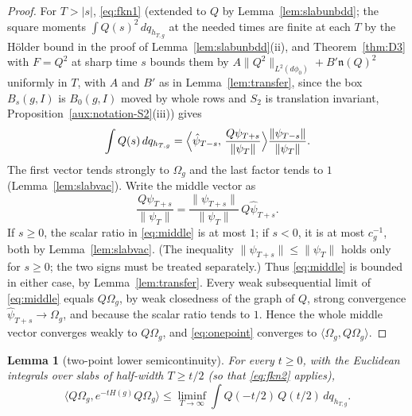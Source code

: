 \documentclass[11pt,a4paper]{article}
\theoremstyle{plain}
\newtheorem{lemma}[theorem]{Lemma}
\theoremstyle{definition}
\theoremstyle{plain}
\theoremstyle{definition}
\newcommand{\Om}{\Omega}
\newcommand{\ip}[2]{\langle #1,#2\rangle}
\begin{document}
\begin{proof}
For $T>|s|$, \eqref{eq:fkn1} (extended to $Q$ by Lemma~\ref{lem:slabunbdd}; the square
moments $\int Q(s)^2\,dq_{h_{T,g}}$ at the needed times are finite at each $T$ by the
H\"older bound in the proof of Lemma~\ref{lem:slabunbdd}(ii), and Theorem~\ref{thm:D3} with
$F=Q^2$ at sharp time $s$ bounds them by $A\|Q^2\|_{L^2(d\phi_0)}+B'\mathfrak n(Q)^2$
uniformly in $T$, with $A$ and $B'$ as in Lemma~\ref{lem:transfer}, since the box
$B_s(g,I)$ is $B_0(g,I)$ moved by whole rows and $S_2$ is translation invariant,
Proposition~\ref{aux:notation-S2}(iii)) gives
\begin{equation}
 \int Q(s)\,dq_{h_{T,g}}
 =\Bigl\langle\hat\psi_{T-s},\,\frac{Q\psi_{T+s}}{\|\psi_T\|}\Bigr\rangle
   \frac{\|\psi_{T-s}\|}{\|\psi_T\|}.
 \label{eq:onepoint}
\end{equation}
The first vector tends strongly to $\Om_g$ and the last factor tends to $1$
(Lemma~\ref{lem:slabvac}). Write the middle vector as
\begin{equation}
 \frac{Q\psi_{T+s}}{\|\psi_T\|}
 =\frac{\|\psi_{T+s}\|}{\|\psi_T\|}\,Q\hat\psi_{T+s} .
 \label{eq:middle}
\end{equation}
If $s\ge0$, the scalar ratio in \eqref{eq:middle} is at most $1$; if $s<0$, it is at most
$c_g^{-1}$, both by Lemma~\ref{lem:slabvac}. (The inequality
$\|\psi_{T+s}\|\le\|\psi_T\|$ holds only for $s\ge0$; the two signs must be treated
separately.) Thus \eqref{eq:middle} is bounded in either case, by
Lemma~\ref{lem:transfer}. Every weak subsequential limit of \eqref{eq:middle} equals
$Q\Om_g$, by weak closedness of the graph of $Q$, strong convergence
$\hat\psi_{T+s}\to\Om_g$, and because the scalar ratio tends to $1$. Hence the whole middle
vector converges weakly to $Q\Om_g$, and \eqref{eq:onepoint} converges to
$\ip{\Om_g}{Q\Om_g}$.
\end{proof}

\begin{lemma}[two-point lower semicontinuity]\label{lem:twopoint}
For every $t\ge0$, with the Euclidean integrals over slabs of half-width $T\ge t/2$
(so that \eqref{eq:fkn2} applies),
\[
 \ip{Q\Om_g}{e^{-tH(g)}Q\Om_g}
 \le\liminf_{T\to\infty}\int Q(-t/2)\,Q(t/2)\,dq_{h_{T,g}} .
\]
\end{lemma}
\end{document}

